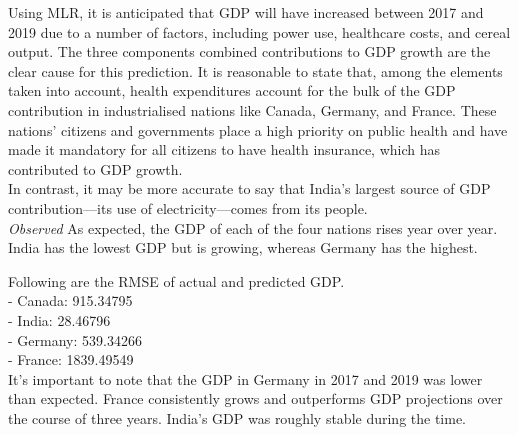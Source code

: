 \documentclass[conference]{IEEEtran}
\begin{document}
Using MLR, it is anticipated that GDP will have increased between 2017 and 2019 due to a number of factors, including power use, healthcare costs, and cereal output. The three components combined contributions to GDP growth are the clear cause for this prediction. It is reasonable to state that, among the elements taken into account, health expenditures account for the bulk of the GDP contribution in industrialised nations like Canada, Germany, and France. These nations' citizens and governments place a high priority on
public health and have made it mandatory for all citizens to have health insurance, which has contributed to GDP growth.
\\
In contrast, it may be more accurate to say that India's largest source of GDP contribution—its use of electricity—comes from its people.
\\
\emph{Observed}
As expected, the GDP of each of the four nations rises year over year. India has the lowest GDP but is growing, whereas Germany has the highest.

Following are the RMSE of actual and predicted GDP.\\
- Canada: 915.34795\\
- India: 28.46796\\
- Germany: 539.34266\\
- France: 1839.49549\\
It's important to note that the GDP in Germany in 2017 and 2019 was lower than expected. France consistently grows and outperforms GDP projections over the course of three years. India's GDP was roughly stable during the time.
\bigskip
\end{document}
